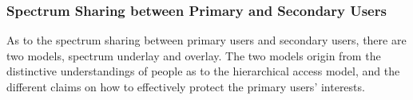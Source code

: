 \subsubsection{Spectrum Sharing between Primary and Secondary Users}
As to the spectrum sharing between primary users and secondary users, there are two models, spectrum underlay and overlay.
The two models origin from the distinctive understandings of people as to the hierarchical access model, and the different claims on how to effectively protect the primary users' interests.


